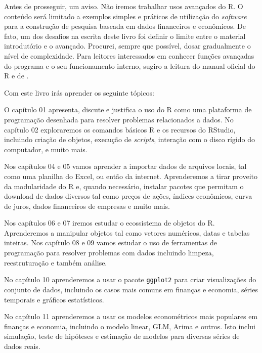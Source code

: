 \documentclass[
  11pt,
]{book}
\providecommand{\tightlist}{%
  \setlength{\itemsep}{0pt}\setlength{\parskip}{0pt}}
\begin{document}
Antes de prosseguir, um aviso. Não iremos trabalhar usos avançados do R. O conteúdo será limitado a exemplos simples e práticos de utilização do \emph{software} para a construção de pesquisa baseada em dados financeiros e econômicos. De fato, um dos desafios na escrita deste livro foi definir o limite entre o material introdutório e o avançado. Procurei, sempre que possível, dosar gradualmente o nível de complexidade. Para leitores interessados em conhecer funções avançadas do programa e o seu funcionamento interno, sugiro a leitura do manual oficial do R \citep{teetor2011r} e de \citet{wickham2019advanced}.

Com este livro irás aprender os seguinte tópicos:

\begin{description}
\tightlist
\item[Usar o R e RStudio]
O capítulo 01 apresenta, discute e justifica o uso do R como uma plataforma de programação desenhada para resolver problemas relacionados a dados. No capítulo 02 exploraremos os comandos básicos R e os recursos do RStudio, incluindo criação de objetos, execução de \emph{scripts}, interação com o disco rígido do computador, e muito mais.
\item[Importação de dados financeiros e econômicos]
Nos capítulos 04 e 05 vamos aprender a importar dados de arquivos locais, tal como uma planilha do Excel, ou então da internet. Aprenderemos a tirar proveito da modularidade do R e, quando necessário, instalar pacotes que permitam o download de dados diversos tal como preços de ações, índices econômicos, curva de juros, dados financeiros de empresas e muito mais.
\item[Limpar, estruturar e analisar dados]
Nos capítulos 06 e 07 iremos estudar o ecossistema de objetos do R. Aprenderemos a manipular objetos tal como vetores numéricos, datas e tabelas inteiras. Nos capítulo 08 e 09 vamos estudar o uso de ferramentas de programação para resolver problemas com dados incluindo limpeza, reestruturação e também análise.
\item[Visualização de dados]
No capítulo 10 aprenderemos a usar o pacote \texttt{ggplot2} para criar visualizações do conjunto de dados, incluindo os casos mais comuns em finanças e economia, séries temporais e gráficos estatísticos.
\item[Analisar dados com econometria]
No capítulo 11 aprenderemos a usar os modelos econométricos mais populares em finanças e economia, incluindo o modelo linear, GLM, Arima e outros. Isto inclui simulação, teste de hipóteses e estimação de modelos para diversas séries de dados reais.

\end{description}
\end{document}
